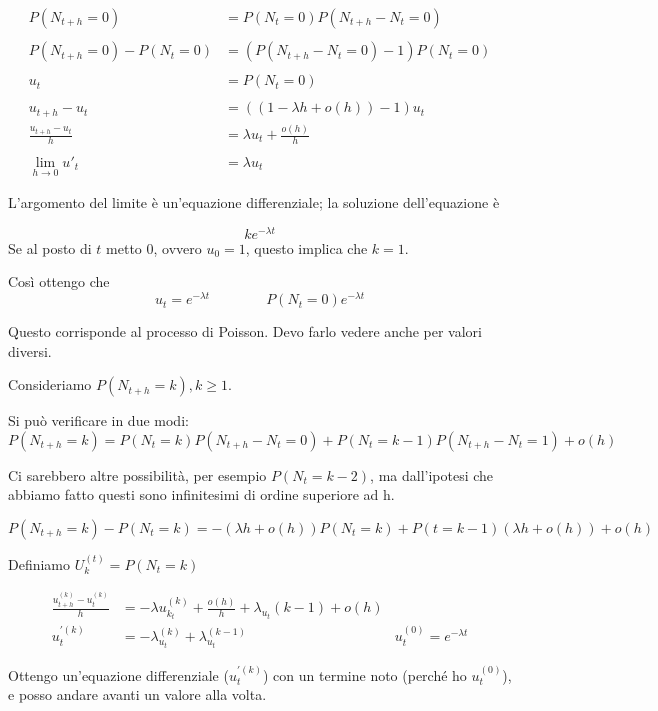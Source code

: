 \documentclass[a4paper,12pt]{book}
\begin{document}
\begin{align*}
	P(N_{t+h} = 0) & = P(N_t = 0) P(N_{t+h} - N_t = 0) \\
	\\
	P(N_{t+h} = 0) - P(N_t = 0) & = (P(N_{t+h} - N_t = 0) - 1 )P(N_t = 0) \\
	\\
	u_t & = P(N_t = 0) \\
	\\
	u_{t+h} - u_t & = ((1 - \lambda h + o(h)) - 1 ) u_t \\
	\frac{u_{t+h} - u_t}{h} & = \lambda u_t + \frac{o(h)}{h} \\
	\\
	\lim\limits_{h \to 0} u'_t & = \lambda u_t
\end{align*}

L'argomento del limite è un'equazione differenziale; la soluzione dell'equazione è

$$ ke^{-\lambda t} $$
Se al posto di $ t $ metto 0, ovvero $ u_0 = 1 $, questo implica che $  k = 1 $.

Così ottengo che 
$$ u_t = e^{-\lambda t} \qquad \qquad P(N_t = 0) e^{-\lambda t} $$

Questo corrisponde al processo di Poisson. Devo farlo vedere anche per valori diversi.

Consideriamo $ P(N_{t+h} = k), k \ge 1 $.

Si può verificare in due modi:
$$ P(N_{t+h} = k) = P(N_t = k) P(N_{t+h} - N_t = 0) + P(N_t = k-1)P(N_{t+h} -N_t = 1) + o(h)$$

Ci sarebbero altre possibilità, per esempio $ P(N_t = k-2) $, ma dall'ipotesi che abbiamo fatto questi sono infinitesimi di ordine superiore ad h. 


$$ P(N_{t+h} = k) - P(N_t = k) = -(\lambda h + o(h)) P(N_{t} = k) + P(t = k - 1)(\lambda h + o(h)) + o(h) $$

Definiamo $ U_k^{(t)} = P(N_{t} = k) $

\begin{align*}
	\frac{u_{t+h}^{(k)}  - u_t^{(k)} }{h} & = -\lambda u_{k_t}^{(k)} + \frac{o(h)}{h} + \lambda_{u_t}(k-1) + o(h) \\
	u_t^{\prime(k)} & = -\lambda_{u_t}^{(k)} + \lambda_{u_t}^{(k-1)} & u_t^{(0)} = e^{-\lambda t}
\end{align*}

Ottengo un'equazione differenziale ($ u_t^{\prime(k)} $) con un termine noto (perché ho $ u_t^{(0)} $), e posso andare avanti un valore alla volta.
\end{document}

